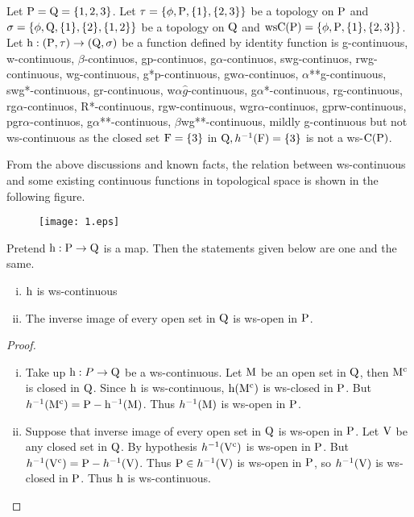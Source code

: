 \begin{exm}\label{exam3.2.7}
Let $\mathrm{P}=\mathrm{Q}= \{1, 2, 3\}$. Let $\tau = \{\phi, \mathrm{P}, \{1\}, \{2,3\}\}$ be a topology on $\mathrm{P}$ and $\sigma =\{\phi, \mathrm{Q}, \{1\},\{2\}, \{1,2\}\}$ be a topology on $\mathrm{Q}$ and $\mathrm{ws}\mathrm{C}(\mathrm{P})=\{\phi, \mathrm{P}, \{1\},\{2,3\}\}$. Let $\mathrm{h}: (\mathrm{P}, \tau )\to (\mathrm{Q}, \sigma)$ be a function defined by identity function is g-continuous, w-continuous, $\beta$-continuos, gp-continuos, g$\alpha$-continuos, swg-continuos, rwg-continuous, wg-continuous, g*p-continuous, gw$\alpha$-continuos, $\alpha${*}{*}g-continuous, swg*-continuous, gr-continuous, w$\alpha\hat{g}$-continuous, g$\alpha$*-continuous, rg-continuous, rg$\alpha$-continuos, R*-continuous, rgw-continuous, wgr$\alpha$-continuos, gprw-continuous, pgr$\alpha$-continuos, g$\alpha${*}{*}-continuous, $\beta$wg{*}{*}-continuous, mildly g-continuous but not ws-continuous as the closed set $\mathrm{F}=\{3\}$ in $\mathrm{Q}, h^{-1} (\mathrm{F})=\{3\}$ is not a ws-$\mathrm{C}(\mathrm{P})$.
\end{exm}

\begin{rem}\label{rem3.2.2} 
From the above discussions and known facts, the relation between ws-continuous and some existing continuous functions in topological space is shown in the following figure.
\begin{figure}[!htb]
\centering
\texttt{[image: 1.eps]}
\end{figure}
\end{rem}

\begin{thm}\label{thm3.2.5}
Pretend $\mathrm{h}: \mathrm{P}\to \mathrm{Q}$ is a map. Then the statements given below are one and the same.
\begin{enumerate}[(i)]
\item $\mathrm{h}$ is ws-continuous
\item The inverse image of every open set in $\mathrm{Q}$ is ws-open in $\mathrm{P}$.
\end{enumerate}
\end{thm}

\begin{proof}
\begin{enumerate}[(i)]
\item Take up $\mathrm{h}: P\to \mathrm{Q}$ be a ws-continuous. Let $\mathrm{M}$ be an open set in $\mathrm{Q}$, then $\mathrm{M}^{\text{c}}$ is closed in $\mathrm{Q}$. Since $\mathrm{h}$ is ws-continuous, $\mathrm{h}(\mathrm{M}^{\text{c}})$ is ws-closed in $\mathrm{P}$. But $h^{-1}(\mathrm{M}^{\text{c}})=\mathrm{P}- \mathrm{h}^{-1}(\mathrm{M})$. Thus $h^{-1}(\mathrm{M})$ is ws-open in $\mathrm{P}$.

\item Suppose that inverse image of every open set in $\mathrm{Q}$ is ws-open in $\mathrm{P}$. Let $\mathrm{V}$ be any closed set in $\mathrm{Q}$. By hypothesis $h^{-1} (\mathrm{V}^{\text{c}})$ is ws-open in $\mathrm{P}$. But $h^{-1}(\mathrm{V}^{\text{c}}) = \mathrm{P}-h^{-1}(\mathrm{V})$. Thus $\mathrm{P}\in h^{-1} (\mathrm{V})$ is ws-open in $\mathrm{P}$, so $h^{-1}(\mathrm{V})$ is ws-closed in $\mathrm{P}$. Thus $\mathrm{h}$ is ws-continuous.
\end{enumerate}
\end{proof}

